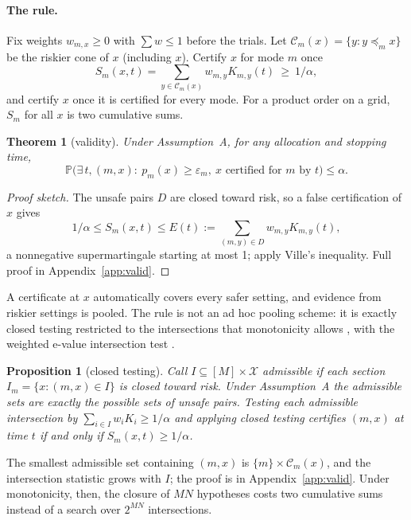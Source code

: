 \documentclass{article}
\newtheorem{theorem}{Theorem}
\newtheorem{proposition}{Proposition}
\newcommand{\eps}{\varepsilon}
\newcommand{\cX}{\mathcal{X}}
\newcommand{\preceqm}{\preceq_m}
\newcommand{\Cone}{\mathcal{C}}
\renewcommand{\P}{\mathbb{P}}
\begin{document}
\paragraph{The rule.} Fix weights $w_{m,x}\ge0$ with $\sum w\le 1$ before
the trials. Let $\Cone_m(x) = \{y : y\preceqm x\}$ be the riskier cone of
$x$ (including $x$). Certify $x$ for mode $m$ once
\begin{equation}\label{eq:cone}
S_m(x,t) = \sum_{y\in\Cone_m(x)} w_{m,y} K_{m,y}(t) \ \ge\ 1/\alpha,
\end{equation}
and certify $x$ once it is certified for every mode. For a product order
on a grid, $S_m$ for all $x$ is two cumulative sums.

\begin{theorem}[validity]\label{thm:valid}
Under Assumption~A, for any allocation and stopping time,
\[
\P\bigl(\exists\, t, (m,x):\ p_m(x)\ge\eps_m,\ x \text{ certified for $m$ by } t\bigr)\le\alpha.
\]
\end{theorem}
\begin{proof}[Proof sketch]
The unsafe pairs $D$ are closed toward risk, so a false certification of
$x$ gives
\[
1/\alpha\le S_m(x,t)\le E(t) := \textstyle\sum_{(m,y)\in D} w_{m,y}K_{m,y}(t),
\]
a nonnegative supermartingale starting at most 1; apply Ville's inequality.
Full proof in Appendix~\ref{app:valid}.
\end{proof}

A certificate at $x$ automatically covers every safer setting, and
evidence from riskier settings is pooled. The rule is not an ad hoc
pooling scheme: it is exactly closed testing \citep{marcus1976closed}
restricted to the intersections that monotonicity allows
\citep{shaffer1986modified}, with the weighted e-value intersection test
\citep{vovk2021evalues}.

\begin{proposition}[closed testing]\label{prop:closed}
Call $I\subseteq[M]\times\cX$ admissible if each section
$I_m=\{x:(m,x)\in I\}$ is closed toward risk. Under Assumption~A the
admissible sets are exactly the possible sets of unsafe pairs. Testing each
admissible intersection by $\sum_{i\in I}w_iK_i\ge1/\alpha$ and applying
closed testing certifies $(m,x)$ at time $t$ if and only if
$S_m(x,t)\ge1/\alpha$.
\end{proposition}
The smallest admissible set containing $(m,x)$ is
$\{m\}\times\Cone_m(x)$, and the intersection statistic grows with $I$;
the proof is in Appendix~\ref{app:valid}. Under monotonicity, then, the
closure of $MN$ hypotheses costs two cumulative sums instead of a search
over $2^{MN}$ intersections.
\end{document}
